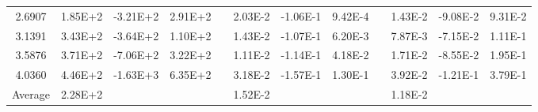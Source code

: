\begin{table}[h]
\begin{center}
\begin{tabular}{cccccccccccc}
    2.6907 &   1.85E+2 &  -3.21E+2 &   2.91E+2 &  &   2.03E-2 &  -1.06E-1 &   9.42E-4 &  &   1.43E-2 &  -9.08E-2 &   9.31E-2 \\
    3.1391 &   3.43E+2 &  -3.64E+2 &   1.10E+2 &  &   1.43E-2 &  -1.07E-1 &   6.20E-3 &  &   7.87E-3 &  -7.15E-2 &   1.11E-1 \\
    3.5876 &   3.71E+2 &  -7.06E+2 &   3.22E+2 &  &   1.11E-2 &  -1.14E-1 &   4.18E-2 &  &   1.71E-2 &  -8.55E-2 &   1.95E-1 \\
    4.0360 &   4.46E+2 &  -1.63E+3 &   6.35E+2 &  &   3.18E-2 &  -1.57E-1 &   1.30E-1 &  &   3.92E-2 &  -1.21E-1 &   3.79E-1 \\
 \hline
Average &  2.28E+2& & & &  1.52E-2& & & &  1.18E-2\\
  \hline
 \end{tabular}
 \label{tab:1}
 \end{center}
 \end{table}



